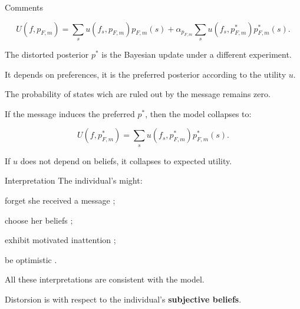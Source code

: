 \documentclass[usenames,dvipsnames,aspectratio=169,11pt, envcountsect]{beamer}
\begin{document}
\begin{frame}{Comments}

	\[
		U \left( f, p_{F,m} \right) = \sum_{s} u \left( f_s, p_{F,m} \right) p_{F,m} \left( s \right) + \alpha_{p_{F,m}} \sum_{s} u \left( f_s, p^{*}_{F,m} \right) p^{*}_{F,m} \left( s \right) .
	\]

	\vfill

	The distorted posterior \( p^{*} \) is the Bayesian update under a different experiment.

	\vfill

	It depends on preferences, it is the preferred posterior according to the utility \( u \).

	\vfill

	The probability of states wich are ruled out by the message remains zero.

	\vfill \pause

	If the message induces the preferred \( p^{*} \), then the model collapses to:

	\[
		U \left( f, p^{*}_{F,m} \right) = \sum_{s} u \left( f_s, p^{*}_{F,m} \right) p^{*}_{F,m} \left( s \right) .
	\]

	If \( u \) does not depend on beliefs, it collapses to expected utility.

\end{frame}

\begin{frame}{Interpretation}
	The individual's might:

	\vfill

	\begin{wideitemize}
		\item forget she received a message \citep{benabou2016mindful}; \pause
		\item choose her beliefs \citep{brunnermeierOptimalExpectations2005}; \pause
		\item exhibit motivated inattention \citep{caplinRevealedPreferenceRational2015}; \pause
		\item be optimistic \citep{sharotOptimismBias2011}.
	\end{wideitemize}

	\vfill

	All these interpretations are consistent with the model.

	\vfill

	Distorsion is with respect to the individual's \textbf{subjective beliefs}.

\end{frame}
\end{document}
